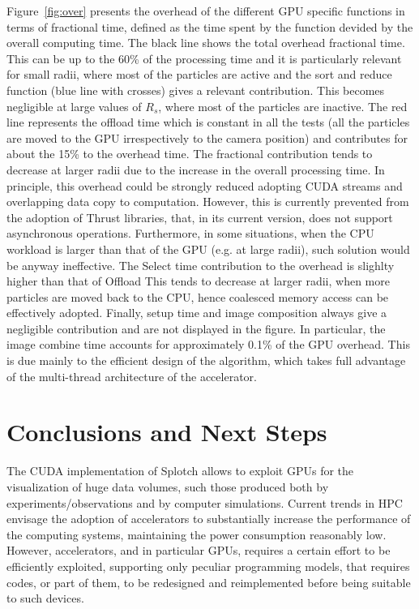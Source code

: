 \documentclass[1p]{elsarticle}
\begin{document}
Figure~\ref{fig:over} presents the overhead of the different GPU specific functions
in terms of fractional time, defined as the time spent by the function devided by
the overall computing time. The black line shows the total overhead fractional time. 
This can be up to the 60\% of the processing time and it is particularly relevant
for small radii, where most of the particles are active and the sort and reduce 
function (blue line with crosses) gives a relevant contribution. This becomes negligible
at large values of $R_s$, where most of the particles are inactive. 
The red line represents the offload time which is constant in all the tests (all the
particles are moved to the GPU irrespectively to the camera position) and contributes for
about the 15\% to the overhead time. The fractional contribution tends to decrease at larger radii
due to the increase in the overall processing time. In principle, this overhead could
be strongly reduced adopting CUDA streams and overlapping data copy to
computation. However, this is currently prevented from the adoption of
Thrust libraries, that, in its current version, does not support asynchronous operations. Furthermore,
in some situations, when the CPU workload is larger than that of
the GPU (e.g. at large radii), such solution would be anyway ineffective. 
The Select time contribution to the overhead is  slighlty higher than that of Offload 
This tends to decrease at larger radii, when more particles are moved 
back to the CPU, hence coalesced memory access can be effectively adopted. 
Finally, setup time and image composition always give a negligible contribution and 
are not displayed in the figure. 
In particular, the image combine time accounts for approximately 0.1\% of 
the GPU overhead. This is due mainly to the efficient design of the 
algorithm, which takes full advantage of the multi-thread architecture 
of the accelerator. 

\section{Conclusions and Next Steps}
\label{sec:conclusions}
The CUDA implementation of Splotch allows to exploit GPUs 
for the visualization of huge data volumes, such those produced both 
by experiments/observations and by computer simulations. Current trends
in HPC envisage the adoption of accelerators to substantially 
increase the performance of the computing systems, maintaining the power
consumption reasonably low. However, accelerators, and in particular 
GPUs, requires a certain effort to be efficiently exploited, 
supporting only peculiar programming models, that requires codes, or part
of them, to be redesigned and reimplemented before being suitable to such devices. 
\end{document}
